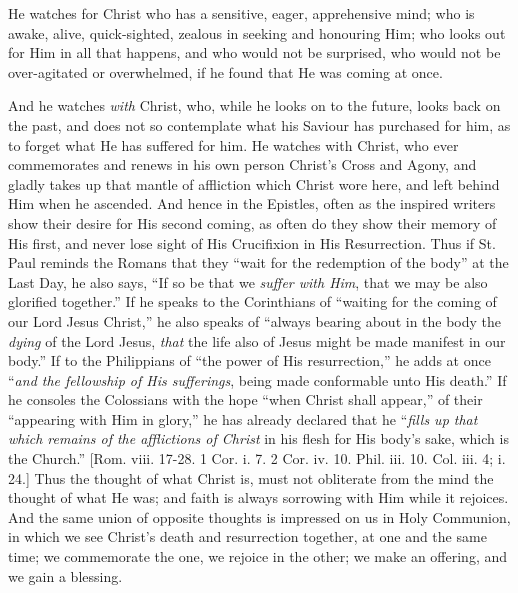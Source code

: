 He watches for Christ who has a sensitive, eager, apprehensive
mind; who is awake, alive, quick-sighted, zealous in seeking and
honouring Him; who looks out for Him in all that happens, and who
would not be surprised, who would not be over-agitated or overwhelmed,
if he found that He was coming at once.

And he watches \emph{with} Christ, who, while he looks on to the
future, looks back on the past, and does not so contemplate what his
Saviour has purchased for him, as to forget what He has suffered for
him. He watches with Christ, who ever commemorates and renews in his
own person Christ's Cross and Agony, and gladly takes up that mantle
of affliction which Christ wore here, and left behind Him when he
ascended. And hence in the Epistles, often as the inspired writers
show their desire for His second coming, as often do they show their
memory of His first, and never lose sight of His Crucifixion in His
Resurrection. Thus if St. Paul reminds the Romans that they ``wait
for the redemption of the body'' at the Last Day, he also says,
``If so be that we \emph{suffer with Him}, that we may be also
glorified together.'' If he speaks to the Corinthians of
``waiting for the coming of our Lord Jesus Christ,'' he also
speaks of ``always bearing about in the body the \emph{dying} of
the Lord Jesus, \emph{that} the life also of Jesus might be made
manifest in our body.'' If to the Philippians of ``the power
of His resurrection,'' he adds at once ``\emph{and the fellowship
of His sufferings}, being made conformable unto His death.'' If
he consoles the Colossians with the hope ``when Christ shall
appear,'' of their ``appearing with Him in glory,'' he has
already declared that he ``\emph{fills up that which remains of the
afflictions of Christ} in his flesh for His body's sake, which is
the Church.'' [Rom. viii. 17-28. 1 Cor. i. 7. 2 Cor. iv. 10. Phil.
iii. 10. Col. iii. 4; i. 24.] Thus the thought of what Christ is, must
not obliterate from the mind the thought of what He was; and faith is
always sorrowing with Him while it rejoices. And the same union of
opposite thoughts is impressed on us in Holy Communion, in which we
see Christ's death and resurrection together, at one and the same
time; we commemorate the one, we rejoice in the other; we make an
offering, and we gain a blessing.

